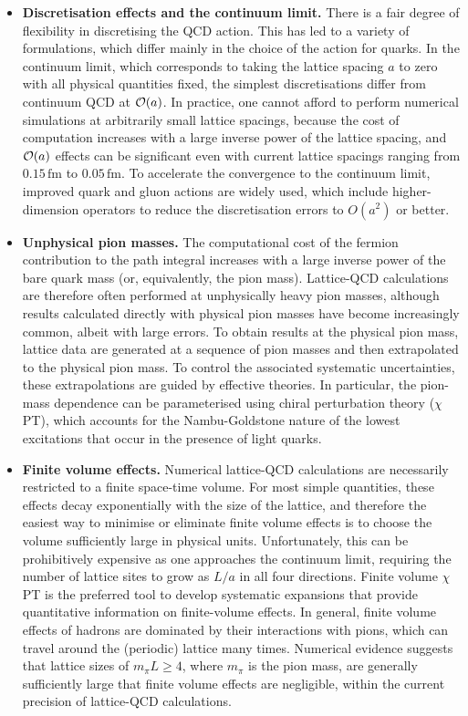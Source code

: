 \begin{itemize}

\item {\bfseries Discretisation effects and the continuum limit.} There is 
a fair degree of flexibility in discretising the QCD action. This has
led to a variety of formulations, which differ mainly in the choice of
the action for quarks.
%
In the continuum limit, which corresponds to taking
the lattice spacing $a$ to zero with all physical quantities fixed,
the simplest discretisations differ from continuum QCD at ${\cal
O}(a)$.
%
In practice, one cannot afford to perform numerical
simulations at arbitrarily small lattice spacings, because the cost of
computation increases with a large inverse power of the lattice
spacing, and ${\cal O}(a)$ effects can be significant even
with current lattice spacings ranging from $0.15 \,\mbox{fm}$ to
$0.05 \,\mbox{fm}$.
%
To accelerate the convergence to the continuum
limit, improved quark and gluon actions are widely used, which include
higher-dimension operators to reduce the discretisation errors to
$O(a^2)$ or better.

\item {\bfseries Unphysical pion masses.} 
The computational cost of the fermion contribution to the path
integral increases with a large inverse power of the bare quark mass
(or, equivalently, the pion mass).
%
Lattice-QCD calculations are therefore
often performed at unphysically heavy pion masses, although results calculated
directly with physical pion masses have become increasingly common, albeit with large
errors.
%
To obtain results at the physical pion mass, lattice data are
generated at a sequence of pion masses and then extrapolated to the
physical pion mass.
%
To control the associated systematic
uncertainties, these extrapolations are guided by effective
theories.
%
In particular, the pion-mass dependence can be parameterised
using chiral perturbation theory ($\chi$PT), which accounts for the
Nambu-Goldstone nature of the lowest excitations that occur in the
presence of light quarks. 

\item {\bfseries Finite volume effects.} Numerical lattice-QCD 
calculations are necessarily restricted to a finite space-time
volume.
%
For most simple quantities, these effects decay exponentially
with the size of the lattice, and therefore the easiest way to
minimise or eliminate finite volume effects is to choose the volume
sufficiently large in physical units.
%
Unfortunately, this can be
prohibitively expensive as one approaches the continuum limit, requiring the
number of lattice sites to grow as $L/a$ in all four directions. Finite volume $\chi$PT is the preferred
tool to develop systematic expansions that provide quantitative
information on finite-volume effects.
%
In general, finite volume
effects of hadrons are dominated by their interactions with pions,
which can travel around the (periodic) lattice many times.
%
Numerical
evidence suggests that lattice sizes of $m_\pi L \geq 4$, where
$m_\pi$ is the pion mass, are generally sufficiently large that finite
volume effects are negligible, within the current precision of lattice-QCD
calculations.


\end{itemize}
